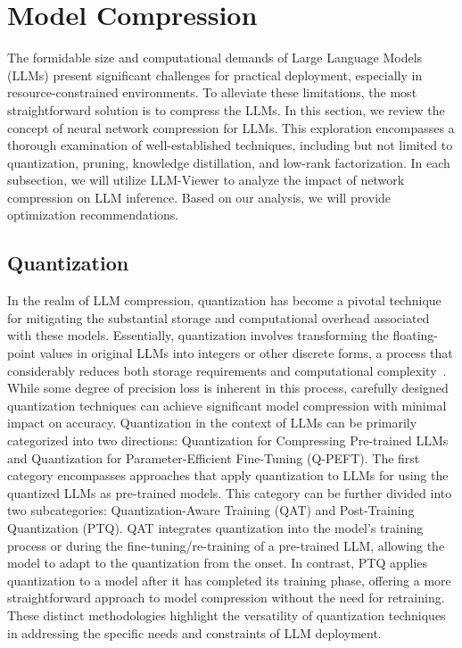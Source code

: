\section{Model Compression}
\label{sec:compression}
The formidable size and computational demands of Large Language Models (LLMs) present significant challenges for practical deployment, especially in resource-constrained environments. To alleviate these limitations, the most straightforward solution is to compress the LLMs. 
In this section, we review the concept of neural network compression for LLMs. This exploration encompasses a thorough examination of well-established techniques, including but not limited to quantization, pruning, knowledge distillation, and low-rank factorization.
In each subsection, we will utilize LLM-Viewer to analyze the impact of network compression on LLM inference. Based on our analysis, we will provide optimization recommendations.

\subsection{Quantization}
\label{sec:quantization}
In the realm of LLM compression, quantization has become a pivotal technique for mitigating the substantial storage and computational overhead associated with these models. Essentially, quantization involves transforming the floating-point values in original LLMs into integers or other discrete forms, a process that considerably reduces both storage requirements and computational complexity~\citep{gholami2022survey}. While some degree of precision loss is inherent in this process, carefully designed quantization techniques can achieve significant model compression with minimal impact on accuracy.
Quantization in the context of LLMs can be primarily categorized into two directions: Quantization for Compressing Pre-trained LLMs and Quantization for Parameter-Efficient Fine-Tuning (Q-PEFT). 
The first category encompasses approaches that apply quantization to LLMs for using the quantized LLMs as pre-trained models. This category can be further divided into two subcategories: Quantization-Aware Training (QAT) and Post-Training Quantization (PTQ). 
QAT integrates quantization into the model’s training process or during the fine-tuning/re-training of a pre-trained LLM, allowing the model to adapt to the quantization from the onset. In contrast, PTQ applies quantization to a model after it has completed its training phase, offering a more straightforward approach to model compression without the need for retraining. These distinct methodologies highlight the versatility of quantization techniques in addressing the specific needs and constraints of LLM deployment.


